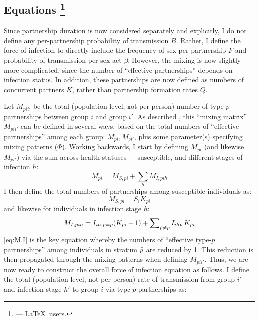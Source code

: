 \subsection[Equations]{Equations%
  \footnote{ --- \LaTeX\ users.}}\label{foi.prop.eq}
Since partnership duration is now considered separately and explicitly,
I do not define any per-partnership probability of transmission $B$.
Rather, I define the force of infection to directly include
the frequency of sex per partnership $F$ and probability of transmission per sex act $\beta$.
However, the mixing is now slightly more complicated,
since the number of ``effective partnerships'' depends on infection status.
In addition, these partnerships are now defined as numbers of concurrent partners $K$,
rather than partnership formation rates $Q$.
\par
Let $M_{pii'}$ be the total (population-level, not per-person)
number of type-$p$ partnerships between group $i$ and group $i'$.
As described , this ``mixing matrix'' $M_{pii'}$ can be defined in several ways,
based on the total numbers of ``effective partnerships'' among each group: $M_{pi}, M_{pi'}$,
plus some parameter(s) specifying mixing patterns (\eg $\Phi$).
Working backwards, I start by defining $M_{pi}$ (and likewise $M_{pi'}$) via
the sum across health statuses --- \ie susceptible, and different stages of infection $h$:
\begin{equation}\label{eq:M.SI}
  M_{pi} = M_{S,pi} + \sum_h M_{I,pih}
\end{equation}
I then define the total numbers of partnerships among susceptible individuals as:
\begin{equation}
  M_{S,pi} = S_{i} K_{pi} \label{eq:M.S}
\end{equation}
and likewise for individuals in infection stage $h$:
\begin{equation}
  M_{I,pih} = I_{ih,\bar{p}=p} (K_{pi}-1) + \sum\nolimits_{\bar{p} \ne p} I_{ih\bar{p}}\,K_{pi} \label{eq:M.I}
\end{equation}
\eqref{eq:M.I} is the key equation whereby
the  numbers of ``effective type-$p$ partnerships'' among
individuals in stratum $\bar{p}$ are reduced by 1.
This reduction is then propagated through the mixing patterns when defining $M_{pii'}$.
Thus, we are now ready to construct the overall force of infection equation as follows.
I define the total (population-level, not per-person) rate of transmission
from group $i'$ and infection stage $h'$ to group $i$ via type-$p$ partnerships as:
